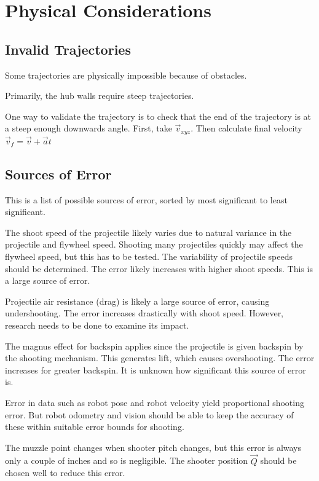 \documentclass{article}
\begin{document}
\section*{Physical Considerations}

\subsection*{Invalid Trajectories}
Some trajectories are physically impossible because of obstacles.

Primarily, the hub walls require steep trajectories.

One way to validate the trajectory is to check that the end of the trajectory is at a steep enough downwards angle. First, take $\vec{v}_{xyz}$. Then calculate final velocity $\vec{v}_f=\vec{v}+\vec{a}t$

\subsection*{Sources of Error}
This is a list of possible sources of error, sorted by most significant to least significant.

The shoot speed of the projectile likely varies due to natural variance in the projectile and flywheel speed. Shooting many projectiles quickly may affect the flywheel speed, but this has to be tested. The variability of projectile speeds should be determined. The error likely increases with higher shoot speeds. This is a large source of error.

Projectile air resistance (drag) is likely a large source of error, causing undershooting. The error increases drastically with shoot speed. However, research needs to be done to examine its impact.

The magnus effect for backspin applies since the projectile is given backspin by the shooting mechanism. This generates lift, which causes overshooting. The error increases for greater backspin. It is unknown how significant this source of error is.

Error in data such as robot pose and robot velocity yield proportional shooting error. But robot odometry and vision should be able to keep the accuracy of these within suitable error bounds for shooting.

The muzzle point changes when shooter pitch changes, but this error is always only a couple of inches and so is negligible. The shooter position $\vec{Q}$ should be chosen well to reduce this error.
\end{document}
